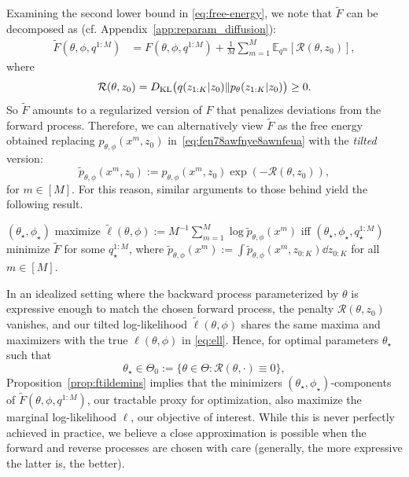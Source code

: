 \documentclass[twoside]{article}
\begin{document}
Examining the second lower bound in \eqref{eq:free-energy}, we note that $\tilde{F}$ can be decomposed as (cf. Appendix~\ref{app:reparam_diffusion}):
\begin{align*}
    \tilde{F}(\theta, \phi, q^{1:M}) 
    &= F(\theta, \phi, q^{1:M}) + \frac{1}{M}\sum_{m=1}^M \mathbb{E}_{q^m}[\mathcal{R}(\theta, z_0)],
    \end{align*}
    where
\begin{align}
    \quad \mathcal{R}(\theta, z_0) &= D_{\mathrm{KL}}\big(q(z_{1:K}|z_{0}) \|p_{\theta}(z_{1:K}|z_{0})\big) \geq 0.
\end{align}
So $\tilde{F}$ amounts to a regularized version of $F$ that penalizes deviations from the forward process.
Therefore, we can alternatively view $\tilde{F}$ as the free energy obtained replacing  $p_{\theta,\phi}(x^m,z_0)$ in~\eqref{eq:fen78awfnye8awnfeua} with the \emph{tilted} version:
\begin{equation}\label{eq:ptildedef}
\tilde{p}_{\theta,\phi}(x^m,z_0):=p_{\theta,\phi}(x^m,z_0)\exp(-\mathcal{R}(\theta,z_0)),
\end{equation}
for $m \in [M]$. For this reason, similar arguments to those behind \cite[Theorem 2]{Neal1998} yield the following result.
\begin{proposition}\label{prop:ftildemins}$(\theta_\star,\phi_\star)$ maximize $\tilde{\ell}(\theta,\phi):=M^{-1}\sum_{m=1}^M\log \tilde{p}_{\theta,\phi}(x^m)$ iff $(\theta_\star,\phi_\star,q^{1:M}_\star)$ minimize $\tilde{F}$ for some $q_\star^{1:M}$, where $\tilde{p}_{\theta,\phi}(x^m) := \int \tilde{p}_{\theta,\phi}(x^m,z_{0:K}) \dd z_{0:K}$ for all $m \in [M]$.
\end{proposition}
In an idealized setting where the backward process parameterized by $\theta$ is expressive enough to match the chosen forward process, the penalty $\mathcal{R}(\theta, z_0)$ vanishes, and our tilted log-likelihood $\tilde{\ell}(\theta,\phi)$ shares the same maxima and maximizers with the true $\ell(\theta,\phi)$ in \eqref{eq:ell}.
Hence, for optimal parameters $\theta_\star$ such that $$\theta_\star \in \Theta_0:=\{\theta\in \Theta: \mathcal{R}(\theta,\cdot)\equiv 0\},$$  Proposition~\ref{prop:ftildemins} implies that the minimizers $(\theta_\star,\phi_\star)$-components of $\tilde{F}(\theta, \phi, q^{1:M})$, our tractable proxy for optimization, also maximize the marginal log-likelihood $\ell$, our objective of interest. 
While this is never perfectly achieved in practice, we believe a close approximation is possible when the forward and reverse processes are chosen with care (generally, the more expressive the latter is, the better).
\end{document}
